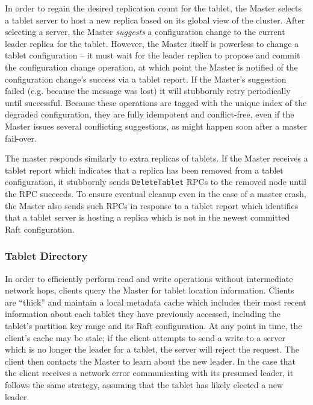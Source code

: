 \documentclass[twocolumn,9pt]{article}
\begin{document}
In order to regain the desired replication count for the tablet, the Master selects
a tablet server to host a new replica based on its global view of the cluster.
After selecting a server, the Master {\em suggests} a configuration change to the current
leader replica for the tablet. However, the Master itself is powerless to change
a tablet configuration -- it must wait for the leader replica to propose and commit
the configuration change operation, at which point the Master is notified of the configuration
change's success via a tablet report. If the Master's suggestion failed (e.g. because the message was lost)
it will stubbornly retry periodically until successful. Because these operations
are tagged with the unique index of the degraded configuration, they are fully
idempotent and conflict-free, even if the Master issues several conflicting
suggestions, as might happen soon after a master fail-over.

The master responds similarly to extra replicas of tablets. If the Master receives a tablet
report which indicates that a replica has been removed from a tablet configuration, it stubbornly
sends {\tt DeleteTablet} RPCs to the removed node until the RPC succeeds. To ensure eventual cleanup
even in the case of a master crash, the Master also sends such RPCs in response to a tablet report
which identifies that a tablet server is hosting a replica which is not in the newest committed Raft
configuration.


\subsubsection{Tablet Directory}
\label{tablet_directory}

In order to efficiently perform read and write operations without intermediate network hops,
clients query the Master for tablet location information. Clients are ``thick'' and maintain
a local metadata cache which includes their most recent information about each tablet they
have previously accessed, including the tablet's partition key range and its Raft configuration.
At any point in time, the client's cache may be stale; if the client attempts to send a write
to a server which is no longer the leader for a tablet, the server will reject the request.
The client then contacts the Master to learn about the new leader. In the case that the
client receives a network error communicating with its presumed leader, it follows the same
strategy, assuming that the tablet has likely elected a new leader.
\end{document}
